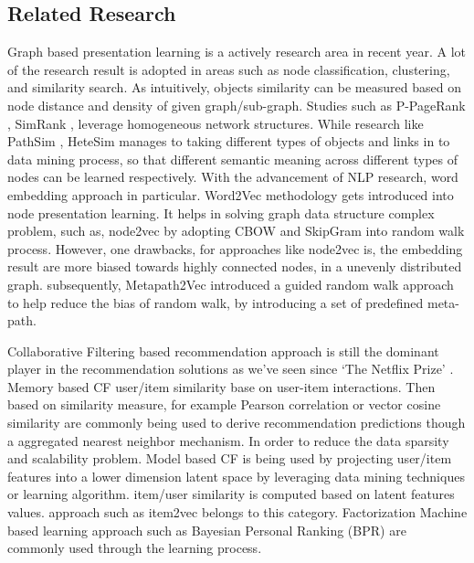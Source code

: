 \subsection{Related Research}
Graph based presentation learning is a actively research area in recent year. A lot of the research result is adopted in areas such as node classification, clustering, and similarity search. As intuitively, objects similarity can be measured based on node distance and density of given graph/sub-graph. Studies such as P-PageRank \cite{bahmani2010fast}, SimRank \cite{jeh2002simrank}, leverage homogeneous network structures. While research like PathSim \cite{sun2011pathsim}, HeteSim \cite{shi2014hetesim} manages to taking different types of objects and links in to data mining process, so that different semantic meaning across different types of nodes can be learned respectively. 
With the advancement of NLP research, word embedding approach in particular. Word2Vec \cite{mikolov2013efficient} methodology gets introduced into node presentation learning. It helps in solving graph data structure complex problem, such as, node2vec \cite{grover2016node2vec} by adopting CBOW and SkipGram into random walk process. However, one drawbacks, for approaches like node2vec is, the embedding result are more biased towards highly connected nodes, in a unevenly distributed graph. subsequently, Metapath2Vec \cite{dong2017metapath2vec} introduced a guided random walk approach to help reduce the bias of random walk, by introducing a set of predefined meta-path. 

Collaborative Filtering based recommendation approach is still the dominant player in the recommendation solutions as we've seen since `The Netflix Prize' \cite{bennett2007netflix}. Memory based CF user/item similarity base on user-item interactions. Then based on similarity measure, for example Pearson correlation or vector cosine similarity are commonly being used to derive recommendation predictions though a aggregated nearest neighbor mechanism. In order to reduce the data sparsity and scalability problem. Model based CF is being used by projecting user/item features into a lower dimension latent space by leveraging data mining techniques or learning algorithm. item/user similarity is computed based on latent features values. approach such as  item2vec \cite{Barkan2016} belongs to this category. Factorization Machine \cite{rendle2010factorization} based learning approach such as Bayesian Personal Ranking (BPR) \cite{rendle2012bpr} are commonly used through the learning process. 

